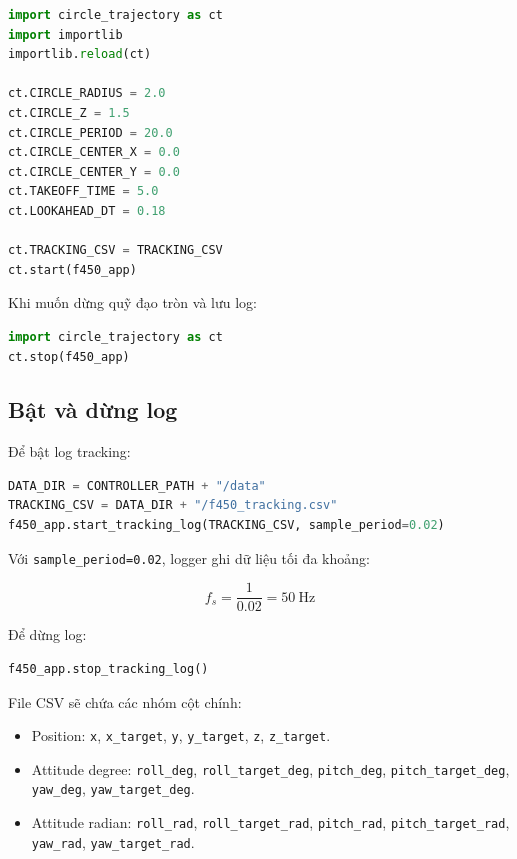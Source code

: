 \begin{lstlisting}[language=Python]
import circle_trajectory as ct
import importlib
importlib.reload(ct)

ct.CIRCLE_RADIUS = 2.0
ct.CIRCLE_Z = 1.5
ct.CIRCLE_PERIOD = 20.0
ct.CIRCLE_CENTER_X = 0.0
ct.CIRCLE_CENTER_Y = 0.0
ct.TAKEOFF_TIME = 5.0
ct.LOOKAHEAD_DT = 0.18

ct.TRACKING_CSV = TRACKING_CSV
ct.start(f450_app)
\end{lstlisting}

Khi muốn dừng quỹ đạo tròn và lưu log:

\begin{lstlisting}[language=Python]
import circle_trajectory as ct
ct.stop(f450_app)
\end{lstlisting}

\subsection{Bật và dừng log}

Để bật log tracking:

\begin{lstlisting}[language=Python]
DATA_DIR = CONTROLLER_PATH + "/data"
TRACKING_CSV = DATA_DIR + "/f450_tracking.csv"
f450_app.start_tracking_log(TRACKING_CSV, sample_period=0.02)
\end{lstlisting}

Với \texttt{sample\_period=0.02}, logger ghi dữ liệu tối đa khoảng:

\begin{equation}
    f_s = \frac{1}{0.02} = 50\ \mathrm{Hz}
\end{equation}

Để dừng log:

\begin{lstlisting}[language=Python]
f450_app.stop_tracking_log()
\end{lstlisting}

File CSV sẽ chứa các nhóm cột chính:

\begin{itemize}
    \item Position: \texttt{x}, \texttt{x\_target}, \texttt{y},
    \texttt{y\_target}, \texttt{z}, \texttt{z\_target}.
    \item Attitude degree: \texttt{roll\_deg},
    \texttt{roll\_target\_deg}, \texttt{pitch\_deg},
    \texttt{pitch\_target\_deg}, \texttt{yaw\_deg},
    \texttt{yaw\_target\_deg}.
    \item Attitude radian: \texttt{roll\_rad},
    \texttt{roll\_target\_rad}, \texttt{pitch\_rad},
    \texttt{pitch\_target\_rad}, \texttt{yaw\_rad},
    \texttt{yaw\_target\_rad}.
\end{itemize}

